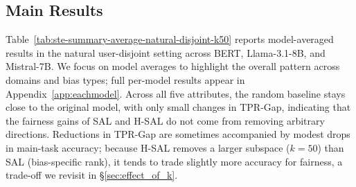 \documentclass[11pt]{article}
\begin{document}
\subsection{Main Results}








Table~\ref{tab:ste-summary-average-natural-disjoint-k50} reports model-averaged results in the natural user-disjoint setting across BERT, Llama-3.1-8B, and Mistral-7B. We focus on model averages to highlight the overall pattern across domains and bias types; full per-model results appear in Appendix~\ref{app:eachmodel}. Across all five attributes, the random baseline stays close to the original model, with only small changes in TPR-Gap, indicating that the fairness gains of SAL and H-SAL do not come from removing arbitrary directions. Reductions in TPR-Gap are sometimes accompanied by modest drops in main-task accuracy; because H-SAL removes a larger subspace ($k=50$) than SAL (bias-specific rank), it tends to trade slightly more accuracy for fairness, a trade-off we revisit in \S\ref{sec:effect_of_k}.
\end{document}
